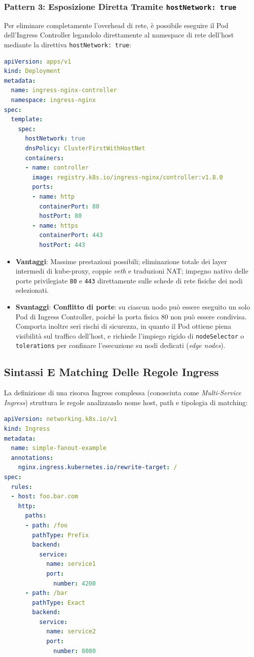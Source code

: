 \documentclass[11pt, a4paper]{article}
\begin{document}
\subsubsection{Pattern 3: Esposizione Diretta Tramite \texttt{hostNetwork: true}}
Per eliminare completamente l'overhead di rete, è possibile eseguire il Pod dell'Ingress Controller legandolo direttamente al namespace di rete dell'host mediante la direttiva \texttt{hostNetwork: true}:

\begin{lstlisting}[language=yaml, caption={Deployment Ingress Controller in modalità \texttt{hostNetwork}}]
apiVersion: apps/v1
kind: Deployment
metadata:
  name: ingress-nginx-controller
  namespace: ingress-nginx
spec:
  template:
    spec:
      hostNetwork: true
      dnsPolicy: ClusterFirstWithHostNet
      containers:
      - name: controller
        image: registry.k8s.io/ingress-nginx/controller:v1.8.0
        ports:
        - name: http
          containerPort: 80
          hostPort: 80
        - name: https
          containerPort: 443
          hostPort: 443
\end{lstlisting}

\begin{itemize}[noitemsep]
    \item \textbf{Vantaggi}: Massime prestazioni possibili; eliminazione totale dei layer intermedi di kube-proxy, coppie \emph{veth} e traduzioni NAT; impegno nativo delle porte privilegiate \texttt{80} e \texttt{443} direttamente sulle schede di rete fisiche dei nodi selezionati.
    \item \textbf{Svantaggi}: \textbf{Conflitto di porte}: su ciascun nodo può essere eseguito un solo Pod di Ingress Controller, poiché la porta fisica 80 non può essere condivisa. Comporta inoltre seri rischi di sicurezza, in quanto il Pod ottiene piena visibilità sul traffico dell'host, e richiede l'impiego rigido di \texttt{nodeSelector} o \texttt{tolerations} per confinare l'esecuzione su nodi dedicati (\emph{edge nodes}).
\end{itemize}

\subsection{Sintassi E Matching Delle Regole Ingress}
La definizione di una risorsa Ingress complessa (conosciuta come \emph{Multi-Service Ingress}) struttura le regole analizzando nome host, path e tipologia di matching:

\begin{lstlisting}[language=yaml, caption={Manifest di Ingress con routing multi-servizio e annotazioni}]
apiVersion: networking.k8s.io/v1
kind: Ingress
metadata:
  name: simple-fanout-example
  annotations:
    nginx.ingress.kubernetes.io/rewrite-target: /
spec:
  rules:
  - host: foo.bar.com
    http:
      paths:
      - path: /foo
        pathType: Prefix
        backend:
          service:
            name: service1
            port:
              number: 4200
      - path: /bar
        pathType: Exact
        backend:
          service:
            name: service2
            port:
              number: 8080
\end{lstlisting}
\end{document}
